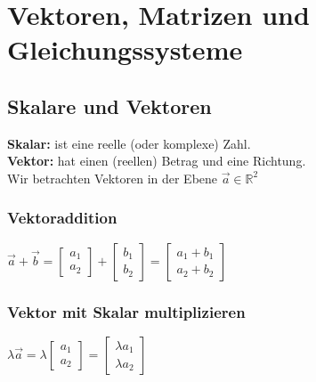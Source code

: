 \documentclass[../main.tex]{subfiles}
\begin{document}

\chapter{Vektoren, Matrizen und Gleichungssysteme}

\section{Skalare und Vektoren}
\textbf{Skalar:} ist eine reelle (oder komplexe) Zahl. \\
\textbf{Vektor:} hat einen (reellen) Betrag und eine Richtung. \\
Wir betrachten Vektoren in der Ebene $\vec{a} \in \mathbb{R}^2$

\subsection{Vektoraddition}
$\vec{a}+\vec{b} = 
\begin{bmatrix}a_1 \\a_2 \end{bmatrix} +  
\begin{bmatrix}b_1 \\b_2\end{bmatrix} = 
\begin{bmatrix}a_1 + b_1 \\a_2 +b_2 \end{bmatrix}$

\subsection{Vektor mit Skalar multiplizieren}
$\lambda\vec{a} = \lambda 
\begin{bmatrix}a_1 \\a_2 \end{bmatrix} = 
\begin{bmatrix}\lambda a_1 \\\lambda a_2 \end{bmatrix}$
\end{document}
